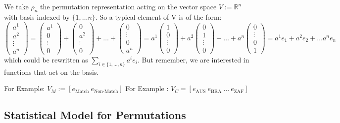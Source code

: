 \documentclass{article}
\theoremstyle{definition}
\begin{document}
We take $\rho_n $ the permutation representation acting on the vector space $V := \mathbb{R}^n$ with basis indexed by $ \{1, \dots n\} $. So a typical element of V is of the form: 
\[ \begin{pmatrix} a^1 \\ a^2 \\ \vdots \\ a^n \end{pmatrix} = \begin{pmatrix} a^1 \\ 0 \\ \vdots \\ 0 \end{pmatrix} + \begin{pmatrix} 0 \\ a^2 \\ \vdots \\ 0 \end{pmatrix} + \dots + \begin{pmatrix} 0 \\  \vdots \\ 0\\ a^n \end{pmatrix} = a^1\begin{pmatrix} 1 \\ 0 \\ \vdots \\ 0 \end{pmatrix} + a^2\begin{pmatrix} 0 \\ 1 \\ \vdots \\ 0 \end{pmatrix} + \dots + a^n\begin{pmatrix} 0 \\  \vdots \\ 0\\ 1\end{pmatrix} = a^1 e_1 + a^2 e_2 + \dots a^n e_n \]which could be rewritten as $\sum_{i \in \{1,\dots,n\} } a^i e_i$. But remember, we are interested in functions that act on the basis.

For Example: $V_{M} := [ e_{\text{Match}} \: e_{\text{Non-Match}} ]$
For Example  : $V_{C} = [ e_{\text{AUS}} \: e_{\text{BRA}} \: \dots \: e_{\text{ZAF}} ]$


\subsection{Statistical Model for Permutations}
\end{document}
